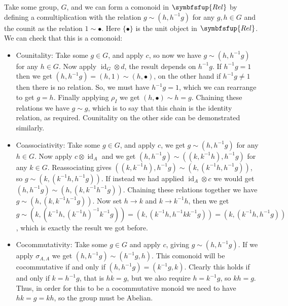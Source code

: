 \documentclass[fleqn]{NotesClass}
\makeatletter
\newcommand{\c@egory}[1]{\symbfsfup{#1}}
\newcommand{\Rel}{\c@egory{Rel}}
\DeclareMathOperator{\id}{id}
\makeatother
\begin{document}
    Take some group, \(G\), and we can form a comonoid in \(\Rel\) by defining a comultiplication with the relation \(g \sim (h, h^{-1}g)\) for any \(g, h \in G\) and the counit as the relation \(1 \sim \bullet\).
    Here \(\{\bullet\}\) is the unit object in \(\Rel\).
    We can check that this is a comonoid:
    \begin{itemize}
        \item Counitality: Take some \(g \in G\), and apply \(c\), so now we have \(g \sim (h, h^{-1}g)\) for any \(h \in G\).
        Now apply \({\id_G} \otimes d\), the result depends on \(h^{-1}g\).
        If \(h^{-1}g = 1\) then we get \((h, h^{-1}g) = (h, 1) \sim (h, \bullet)\), on the other hand if \(h^{-1}g \ne 1\) then there is no relation.
        So, we must have \(h^{-1}g = 1\), which we can rearrange to get \(g = h\).
        Finally applying \(\rho_I\) we get \((h, \bullet) \sim h = g\).
        Chaining these relations we have \(g \sim g\), which is to say that this chain is the identity relation, as required.
        Counitality on the other side can be demonstrated similarly.
        \item Coassociativity: Take some \(g \in G\), and apply \(c\), we get \(g \sim (h, h^{-1}g)\) for any \(h \in G\).
        Now apply \(c \otimes \id_A\) and we get \((h, h^{-1}g) \sim ((k, k^{-1}h), h^{-1}g)\) for any \(k \in G\).
        Reassociating gives \(((k, k^{-1}h), h^{-1}g) \sim (k, (k^{-1}h, h^{-1}g))\), so \(g \sim (k, (k^{-1}h, h^{-1}g))\).
        If instead we had applied \({\id_A} \otimes c\) we would get \((h, h^{-1}g) \sim (h, (k, k^{-1}h^{-1}g))\).
        Chaining these relations together we have \(g \sim (h, (k, k^{-1}h^{-1}g))\).
        Now set \(h \to k\) and \(k \to k^{-1}h\), then we get \(g \sim (k, (k^{-1}h, (k^{-1}h)^{-1}k^{-1}g)) = (k, (k^{-1}h, h^{-1}kk^{-1}g)) = (k, (k^{-1}h, h^{-1}g))\), which is exactly the result we got before.
        \item Cocommutativity: Take some \(g \in G\) and apply \(c\), giving \(g \sim (h, h^{-1}g)\).
        If we apply \(\sigma_{A,A}\) we get \((h, h^{-1}g) \sim (h^{-1}g, h)\).
        This comonoid will be cocommutative if and only if \((h, h^{-1}g) = (k^{-1}g, k)\).
        Clearly this holds if and only if \(k = h^{-1}g\), that is \(hk = g\), but we also require \(h = k^{-1}g\), so \(kh = g\).
        Thus, in order for this to be a cocommutative monoid we need to have \(hk = g = kh\), so the group must be Abelian.
    \end{itemize}
    
\end{document}
